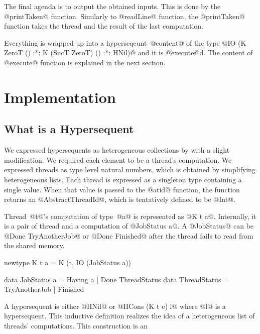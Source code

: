 The final agenda is to output the obtained inputs.  This is done by the
@printTaken@ function.
Similarly to @readLine@ function, the @printTaken@ function takes the
thread and the result of the last computation.

Everything is wrapped up into a hyperseqeunt~@content@ of the type
@IO (K ZeroT () :*: K (SucT ZeroT) () :*: HNil)@
and it is @execute@d.  The content of @execute@ function is explained in
the next section.

\section{Implementation}

\subsection{What is a Hypersequent}
We expressed hypersequents as heterogeneous collections by \citet{hetero}
with a slight modification.  We required each element to be a thread's
computation.
We expressed threads as type level natural numbers, which is obtained by
simplifying heterogeneous lists.
Each thread is expressed as a singleton type containing a single value.
When that value is passed to the @atid@ function, the function returns
an @AbstractThreadId@, which is tentatively defined to be @Int@.
Thread~@t@'s computation of type~@a@ is represented as @K t a@.
Internally, it is a pair of thread and a computation of @JobStatus a@.
A @JobStatus@ can be @Done TryAnotherJob@ or @Done Finished@ after the
thread fails to read from the shared memory.
\begin{code}
newtype K t a = K (t, IO (JobStatus a))

data JobStatus a = Having a | Done ThreadStatus
data ThreadStatus = TryAnotherJob | Finished
\end{code}
A hypersequent is either @HNil@ or @HCons (K t e) l@ where @l@ is a
hypersequent.  This inductive definition realizes the idea of a
heterogeneous list of threads' computations.  This construction is an
